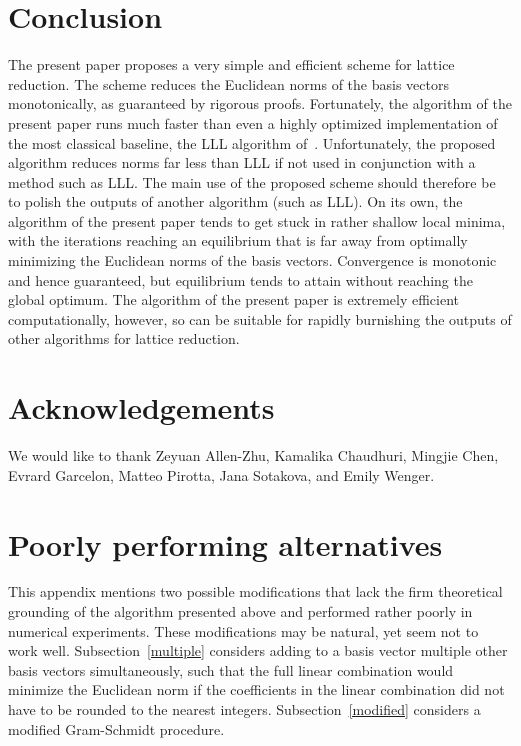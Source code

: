 \documentclass{article}
\begin{document}
\section{Conclusion}
\label{conclusion}

The present paper proposes a very simple and efficient scheme
for lattice reduction. The scheme reduces the Euclidean norms
of the basis vectors monotonically, as guaranteed by rigorous proofs.
Fortunately, the algorithm of the present paper runs much faster
than even a highly optimized implementation of the most classical baseline,
the LLL algorithm of~\cite{lenstra-lenstra-lovasz}.
Unfortunately, the proposed algorithm reduces norms far less than LLL
if not used in conjunction with a method such as LLL.
The main use of the proposed scheme should therefore be to polish the outputs
of another algorithm (such as LLL).
On its own, the algorithm of the present paper tends to get stuck
in rather shallow local minima, with the iterations reaching an equilibrium
that is far away from optimally minimizing the Euclidean norms
of the basis vectors. Convergence is monotonic and hence guaranteed,
but equilibrium tends to attain without reaching the global optimum.
The algorithm of the present paper is extremely efficient computationally,
however, so can be suitable for rapidly burnishing the outputs
of other algorithms for lattice reduction.



\section*{Acknowledgements}

We would like to thank Zeyuan Allen-Zhu, Kamalika Chaudhuri, Mingjie Chen,
Evrard Garcelon, Matteo Pirotta, Jana Sotakova, and Emily Wenger.



\clearpage



\appendix
\section{Poorly performing alternatives}
\label{poor}

This appendix mentions two possible modifications that lack
the firm theoretical grounding of the algorithm presented above
and performed rather poorly in numerical experiments.
These modifications may be natural, yet seem not to work well.
Subsection~\ref{multiple} considers adding to a basis vector
multiple other basis vectors simultaneously,
such that the full linear combination would minimize the Euclidean norm
if the coefficients in the linear combination did not have to be rounded
to the nearest integers.
Subsection~\ref{modified} considers a modified Gram-Schmidt procedure.
\end{document}
